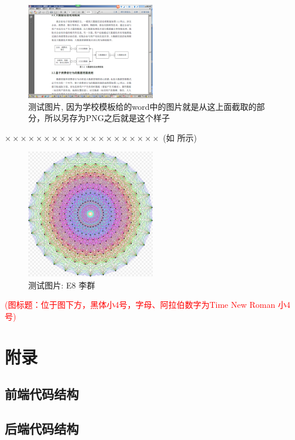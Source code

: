\documentclass[a4paper]{article}
\begin{document}
\begin{figure}[H]
	\centering
	\includegraphics[width=0.5\textwidth]{testmindmap}
	\caption{测试图片, 因为学校模板给的word中的图片就是从这上面截取的部分，所以另存为PNG之后就是这个样子}
	\label{testfig}
\end{figure}
$ \times\times\times\times\times\times\times\times\times\times\times\times\times\times\times\times\times\times\times\times $  (如 所示)
\begin{figure}[H]
	\centering
	\includegraphics[width=0.5\textwidth]{E8Petrie}
	\caption{测试图片: E8 李群}
	\label{E8}
\end{figure}
\textcolor{red}{(图标题：位于图下方，黑体小4号，字母、阿拉伯数字为Time New Roman 小4号)}

\sectionbreak

\clearpage
{}
{}

\label{bibtexref}

\clearpage
\appendix
{}
{}
\section*{附录}
\renewcommand{\thesubsection}{\thesection\Alph{subsection}}
\subsection{前端代码结构}
\subsection{后端代码结构}
\end{document}
